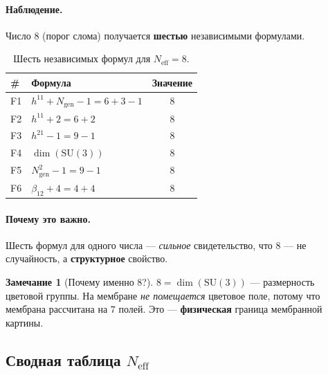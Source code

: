 \documentclass[11pt,a4paper]{article}
\newcommand{\SU}{\mathrm{SU}}
\newcommand{\Ngen}{N_{\text{gen}}}
\newcommand{\Neff}{N_{\text{eff}}}
\theoremstyle{definition}
\newtheorem{remark}[theorem]{Замечание}
\begin{document}
\paragraph{Наблюдение.}
Число $8$ (порог слома) получается \textbf{шестью} независимыми 
формулами.

\begin{table}[htbp]
\centering
\caption{Шесть независимых формул для $\Neff = 8$.}
\label{tab:six-neff-8}
\begin{tabular}{llc}
\toprule
\# & Формула & Значение \\
\midrule
F1 & $h^{11} + \Ngen - 1 = 6 + 3 - 1$ & $8$ \\
F2 & $h^{11} + 2 = 6 + 2$ & $8$ \\
F3 & $h^{21} - 1 = 9 - 1$ & $8$ \\
F4 & $\dim(\SU(3))$ & $8$ \\
F5 & $\Ngen^2 - 1 = 9 - 1$ & $8$ \\
F6 & $\beta_{12} + 4 = 4 + 4$ & $8$ \\
\bottomrule
\end{tabular}
\end{table}

\paragraph{Почему это важно.}
Шесть формул для одного числа — \emph{сильное} свидетельство, 
что $8$ — не случайность, а \textbf{структурное} свойство.

\begin{remark}[Почему именно $8$?]
\label{rem:why-8}
$8 = \dim(\SU(3))$ — размерность цветовой группы. 
На мембране \emph{не помещается} цветовое поле, потому что 
мембрана рассчитана на $7$ полей. Это — \textbf{физическая} 
граница мембранной картины.
\end{remark}

\subsection{Сводная таблица $N_{\text{eff}}$}
\label{subsec:neff-summary-table}
\end{document}
